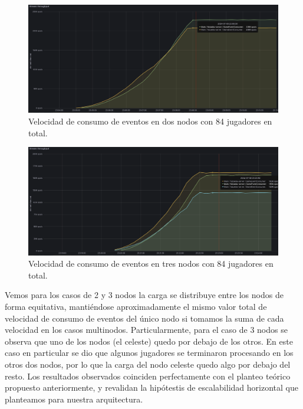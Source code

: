 \begin{figure}[htbp]
    \centering
    \includegraphics[width=1\textwidth]{../assets/fiubakka-consumer-two-node-metrics.png}
    \caption{Velocidad de consumo de eventos en dos nodos con 84 jugadores en total.}
\end{figure}

\newpage

\begin{figure}[htbp]
    \centering
    \includegraphics[width=1\textwidth]{../assets/fiubakka-consumer-three-node-metrics.png}
    \caption{Velocidad de consumo de eventos en tres nodos con 84 jugadores en total.}
\end{figure}

Vemos para los casos de 2 y 3 nodos la carga se distribuye entre los nodos de forma equitativa, mantiéndose aproximadamente el mismo valor total de velocidad de consumo de eventos del único nodo si tomamos la suma
de cada velocidad en los casos multinodos. Particularmente, para el caso de 3 nodos se observa que uno de los nodos (el celeste) quedo por debajo de los otros. En este caso en particular se dio que algunos jugadores se terminaron procesando
en los otros dos nodos, por lo que la carga del nodo celeste quedo algo por debajo del resto. Los resultados observados coinciden perfectamente con el planteo teórico propuesto anteriormente, y revalidan la hipótestis de escalabilidad
horizontal que planteamos para nuestra arquitectura.

